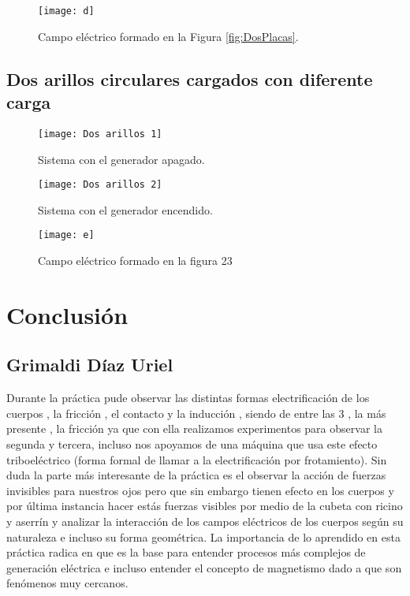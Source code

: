 \documentclass[14pt]{article}
\begin{document}
\begin{multicols}{2}
\begin{figure}[h!]
	\centering
	\texttt{[image: d]}
	\caption{Campo eléctrico formado en la Figura \ref{fig:DosPlacas}.}
\end{figure}


\subsection{Dos arillos circulares cargados con diferente carga}

\begin{figure}[h!]
	\centering
	\texttt{[image: Dos arillos 1]}
	\caption{Sistema con el generador apagado.}
	\texttt{[image: Dos arillos 2]}
	\caption{Sistema con el generador encendido.}
	\texttt{[image: e]}
	\caption{Campo eléctrico formado en la figura 23}
\end{figure}

\clearpage
\newpage





\section{Conclusión}
\subsection{Grimaldi Díaz Uriel}

Durante la práctica pude observar las distintas formas electrificación de los cuerpos , la fricción , el contacto y la inducción , siendo de entre las 3 , la más presente , la fricción ya que con ella realizamos experimentos para observar la segunda y tercera, incluso nos apoyamos de una máquina que usa este efecto triboeléctrico (forma formal de llamar a la electrificación por frotamiento). Sin duda la parte más interesante de la práctica es el observar la acción de fuerzas invisibles para nuestros ojos pero que sin embargo tienen efecto en los cuerpos y por última instancia hacer estás fuerzas visibles por medio de la cubeta con ricino y aserrín y analizar la interacción de los campos eléctricos de los cuerpos según su naturaleza e incluso su forma geométrica. La importancia de lo aprendido en esta práctica radica en que es la base para entender procesos más complejos de generación eléctrica e incluso entender el concepto de magnetismo dado a que son fenómenos muy cercanos.

\end{multicols}
\end{document}
